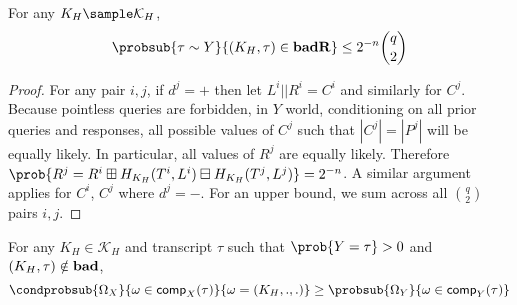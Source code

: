\documentclass[eprint.tex]{subfiles}
\begin{document}
\begin{lemma} \label{badR}
    For any $K_H \sample \mathcal{K}_H$,
    \begin{displaymath}
        \probsub{\tau \sim Y}{(K_H, \tau) \in \badR}
        \leq 2^{-n} \binom{q}{2}
    \end{displaymath}
\end{lemma}

\begin{proof}
    For any pair $i, j$, if $d^j = +$ then let $L^i || R^i = C^i$ and similarly for $C^j$.
    Because pointless queries are forbidden, in $Y$ world,
    conditioning on all prior queries and responses,
    all possible values of $C^j$ such that $|C^j| = |P^j|$ will be equally likely.
    In particular, all values of $R^j$ are equally likely. Therefore
    $\prob{R^j = R^i \boxplus H_{K_H}(T^i, L^i) \boxminus H_{K_H}(T^j, L^j)} = 2^{-n}$.
    A similar argument applies for $C^i$, $C^j$ where $d^j = -$.
    For an upper bound, we sum across all $\binom{q}{2}$ pairs $i, j$.
\end{proof}

\begin{lemma} \label{notbad}
    For any $K_H \in \mathcal{K}_H$ and transcript $\tau$ such that $\prob{Y = \tau} > 0$ and
    $(K_H, \tau) \notin \operatorname{\mathbf{bad}}$,
    \begin{displaymath}
        \condprobsub{\Omega_X}{\omega \in \comp_X(\tau)}{\omega = (K_H, ., .)}
        \geq
        \probsub{\Omega_Y}{\omega \in \comp_Y(\tau)}
    \end{displaymath}
\end{lemma}
\end{document}
